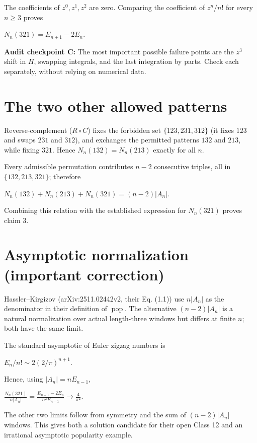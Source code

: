 \documentclass[
  11pt,
]{article}
\let\oldsection\section
\renewcommand{\section}{\needspace{5\baselineskip}\oldsection}
\begin{document}
The coefficients of \(z^0,z^1,z^2\) are zero. Comparing the coefficient
of \(z^n/n!\) for every \(n\geq3\) proves

\(N_n(321)=E_{n+1}-2E_n\).

\textbf{Audit checkpoint C:} The most important possible failure points
are the \(z^3\) shift in \(H\), swapping integrals, and the last
integration by parts. Check each separately, without relying on
numerical data.

\section{The two other allowed
patterns}\label{the-two-other-allowed-patterns}

Reverse-complement (\(R\circ C\)) fixes the forbidden set
\(\{123,231,312\}\) (it fixes \(123\) and swaps \(231\) and \(312\)),
and exchanges the permitted patterns \(132\) and \(213\), while fixing
\(321\). Hence \(N_n(132)=N_n(213)\) exactly for all \(n\).

Every admissible permutation contributes \(n-2\) consecutive triples,
all in \(\{132,213,321\}\); therefore

\(N_n(132)+N_n(213)+N_n(321)=(n-2)|A_n|\).

Combining this relation with the established expression for \(N_n(321)\)
proves claim 3.

\section{Asymptotic normalization (important
correction)}\label{asymptotic-normalization-important-correction}

Hassler--Kirgizov (arXiv:2511.02442v2, their Eq. (1.1)) use \(n|A_n|\)
as the denominator in their definition of \(\operatorname{pop}\). The
alternative \((n-2)|A_n|\) is a natural normalization over actual
length-three windows but differs at finite \(n\); both have the same
limit.

The standard asymptotic of Euler zigzag numbers is

\(E_n/n!\sim2(2/\pi)^{n+1}\).

Hence, using \(|A_n|=nE_{n-1}\),

\(\frac{N_n(321)}{n|A_n|}=\frac{E_{n+1}-2E_n}{n^2E_{n-1}}\longrightarrow\frac4{\pi^2}\).

The other two limits follow from symmetry and the sum of \((n-2)|A_n|\)
windows. This gives both a solution candidate for their open Class 12
and an irrational asymptotic popularity example.
\end{document}
